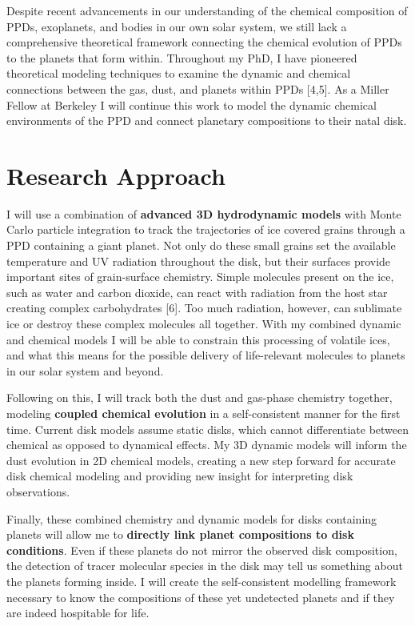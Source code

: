 \documentclass[11pt]{article}
\let\Oldsection\section
\renewcommand{\section}{\FloatBarrier\Oldsection}
\begin{document}
Despite recent advancements in our understanding of the chemical
composition of PPDs, exoplanets, and bodies in our own solar system, we
still lack a comprehensive theoretical framework connecting the chemical
evolution of PPDs to the planets that form within. Throughout my PhD, I
have pioneered theoretical modeling techniques to examine the dynamic
and chemical connections between the gas, dust, and planets within PPDs
{[}4,5{]}. As a Miller Fellow at Berkeley I will continue this work to
model the dynamic chemical environments of the PPD and connect planetary
compositions to their natal disk.

\hypertarget{research-approach}{%
\section{Research Approach}\label{research-approach}}

I will use a combination of \textbf{advanced 3D hydrodynamic models}
with Monte Carlo particle integration to track the trajectories of ice
covered grains through a PPD containing a giant planet. Not only do
these small grains set the available temperature and UV radiation
throughout the disk, but their surfaces provide important sites of
grain-surface chemistry. Simple molecules present on the ice, such as
water and carbon dioxide, can react with radiation from the host star
creating complex carbohydrates {[}6{]}. Too much radiation, however, can
sublimate ice or destroy these complex molecules all together. With my
combined dynamic and chemical models I will be able to constrain this
processing of volatile ices, and what this means for the possible
delivery of life-relevant molecules to planets in our solar system and
beyond.

Following on this, I will track both the dust and gas-phase chemistry
together, modeling \textbf{coupled chemical evolution} in a
self-consistent manner for the first time. Current disk models assume
static disks, which cannot differentiate between chemical as opposed to
dynamical effects. My 3D dynamic models will inform the dust evolution
in 2D chemical models, creating a new step forward for accurate disk
chemical modeling and providing new insight for interpreting disk
observations.

Finally, these combined chemistry and dynamic models for disks
containing planets will allow me to \textbf{directly link planet
compositions to disk conditions}. Even if these planets do not mirror
the observed disk composition, the detection of tracer molecular species
in the disk may tell us something about the planets forming inside. I
will create the self-consistent modelling framework necessary to know
the compositions of these yet undetected planets and if they are indeed
hospitable for life.
\end{document}
